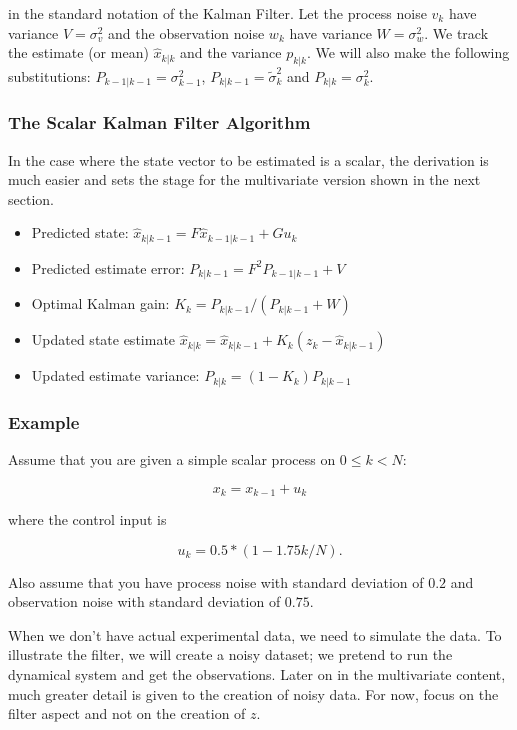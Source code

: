 in the standard notation of the Kalman Filter. Let the process noise
\(v_k\) have variance \(V = \sigma_v^2\) and the observation noise
\(w_k\) have variance \(W = \sigma_w^2\). We track the estimate (or
mean) \(\hat{x}_{k|k}\) and the variance \(p_{k|k}\). We will also make
the following substitutions: \(P_{k-1|k-1} = \sigma_{k-1}^2\),
\(P_{k|k-1} = \tilde{\sigma}_k^2\) and \(P_{k|k} = \sigma_{k}^2\).

\hypertarget{the-scalar-kalman-filter-algorithm}{%
\subsubsection{The Scalar Kalman Filter
Algorithm}\label{the-scalar-kalman-filter-algorithm}}

In the case where the state vector to be estimated is a scalar, the
derivation is much easier and sets the stage for the multivariate
version shown in the next section.

\begin{itemize}
\tightlist
\item
  Predicted state: \(\hat{x}_{k|k-1} = F\hat{x}_{k-1|k-1} + G u_{k}\)
\item
  Predicted estimate error: \(P_{k|k-1} = F^2 P_{k-1|k-1}  + V\)
\item
  Optimal Kalman gain: \(K_k = P_{k|k-1}/( P_{k|k-1}  + W)\)
\item
  Updated state estimate
  \(\hat{x}_{k|k} =\hat{x}_{k|k-1} + K_k (z_k - \hat{x}_{k|k-1})\)
\item
  Updated estimate variance: \(P_{k|k} = (1 - K_k) P_{k|k-1}\)
\end{itemize}

\hypertarget{example}{%
\subsubsection{Example}\label{example}}

Assume that you are given a simple scalar process on \(0 \leq k < N\):

\[x_k = x_{k-1} + u_k\]

where the control input is

\[u_k = 0.5*(1 - 1.75k/N).\]

Also assume that you have process noise with standard deviation of
\(0.2\) and observation noise with standard deviation of \(0.75\).

When we don't have actual experimental data, we need to simulate the
data. To illustrate the filter, we will create a noisy dataset; we
pretend to run the dynamical system and get the observations. Later on
in the multivariate content, much greater detail is given to the
creation of noisy data. For now, focus on the filter aspect and not on
the creation of \(z\).

